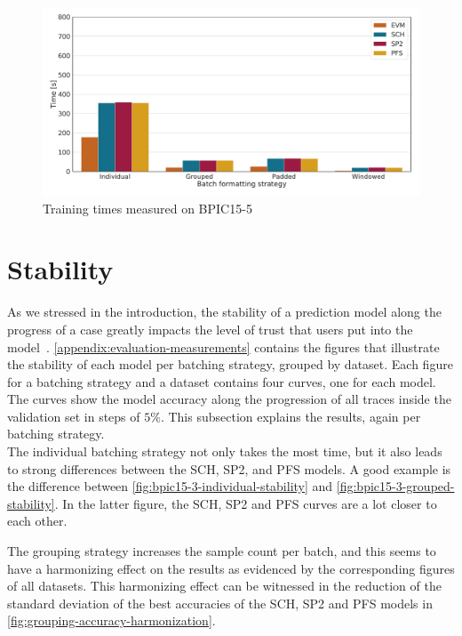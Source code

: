 \begin{figure}
    \centering
    \includegraphics[width=\textwidth]{gfx/bpic2015_5/train_timings.pdf}
    \caption{Training times measured on BPIC15-5}
    \label{fig:BPIC15-5-training-timings}
\end{figure}
\FloatBarrier

\section{Stability}\label{sec:eval:stability}
As we stressed in the introduction, the stability of a prediction model along the progress of a case greatly impacts the level of trust that users put into the model~\cite{metzger2015}. \autoref{appendix:evaluation-measurements} contains the figures that illustrate the stability of each model per batching strategy, grouped by dataset. Each figure for a batching strategy and a dataset contains four curves, one for each model. The curves show the model accuracy along the progression of all traces inside the validation set in steps of $5\%$. This subsection explains the results, again per batching strategy.\\

The individual batching strategy not only takes the most time, but it also leads to strong differences between the SCH, SP2, and PFS models. A good example is the difference between \autoref{fig:bpic15-3-individual-stability} and \autoref{fig:bpic15-3-grouped-stability}. In the latter figure, the SCH, SP2 and PFS curves are a lot closer to each other.

The grouping strategy increases the sample count per batch, and this seems to have a harmonizing effect on the results as evidenced by the corresponding figures of all datasets. This harmonizing effect can be witnessed in the reduction of the standard deviation of the best accuracies of the SCH, SP2 and PFS models in \autoref{fig:grouping-accuracy-harmonization}.

